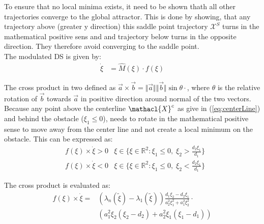 To ensure that no local minima exists, it need to be shown thath all other trajectories converge to the global attractor. This is done by showing, that any trajectory above (greater y direction) this saddle point trajectory $\mathcal{X}^S$ turns in the mathematical positive sens and and trajectory below turns in the opposite direction. They therefore avoid converging to the saddle point.\\

The modulated DS is given by:
\begin{align}
  \dot{\xi} &= \hat{M}(\xi) \cdot f(\xi)
\end{align}

The cross product in two defined as $\vec a \times \vec b = \Vert \vec a \Vert \Vert \vec b \Vert \sin \theta \cdot$, where $\theta$ is the relative rotation of $\vec b$ towards $\vec a$ in positive direction around normal of the two vectors. Because any point above the centerline $\mathacl{X}^c$ as give in (\ref{eq:centerLine}) and behind the obstacle ($\xi_1 \leq 0$), needs to rotate in the mathematical positive sense to move away from the center line and not create a local minimum on the obstacle. This can be expressed as:
\begin{align}
  &f(\xi) \times \dot \xi > 0 &\xi \in \{\xi \in \mathbb{R}^2: \xi_1 \leq 0,\; \xi_2 > \frac{d_2 \xi_1}{d_1}  \} \label{eq:condition_noMimima} \\
  &f(\xi) \times \dot \xi < 0 &\xi \in  \{\xi \in \mathbb{R}^2: \xi_1 \leq 0,\; \xi_2 < \frac{d_2 \xi_1}{d_1}  \} \label{eq:condition_noMimima2}
\end{align}

The cross product is evaluated as:
\begin{equation} \label{eq:crossProduct}
  \begin{split}
  f(\xi) \times \dot \xi =&  \left( \lambda_n(\tilde \xi) - \lambda_{1}(\tilde \xi) \right) \frac{d_1\xi_2 - d_2 \xi_1}{a_2^2 \xi_1^2 + a_1^2 \xi_2^2} \cdot \\
  & \left(a_1^2\xi_2(\xi_2 - d_2) + a_2^2 \xi_1 (\xi_1 - d_1)  \right)
  \end{split}
\end{equation}

